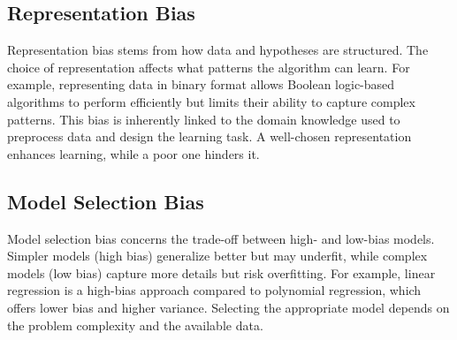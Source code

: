 \documentclass[10pt,a4paper]{article}
\begin{document}
\subsection*{Representation Bias}
Representation bias stems from how data and hypotheses are structured. The choice of representation affects what patterns the algorithm can learn. For example, representing data in binary format allows Boolean logic-based algorithms to perform efficiently but limits their ability to capture complex patterns. This bias is inherently linked to the domain knowledge used to preprocess data and design the learning task. A well-chosen representation enhances learning, while a poor one hinders it.

\subsection*{Model Selection Bias}
Model selection bias concerns the trade-off between high- and low-bias models. Simpler models (high bias) generalize better but may underfit, while complex models (low bias) capture more details but risk overfitting. For example, linear regression is a high-bias approach compared to polynomial regression, which offers lower bias and higher variance. Selecting the appropriate model depends on the problem complexity and the available data.
\end{document}
